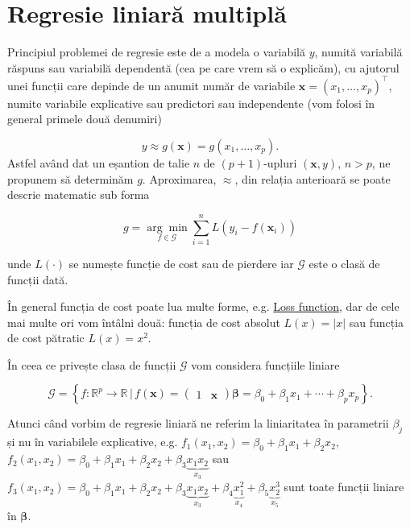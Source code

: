 \documentclass[]{article}
\begin{document}
\section{Regresie liniară multiplă}\label{regresie-liniara-multipla}

Principiul problemei de regresie este de a modela o variabilă \(y\),
numită variabilă răspuns sau variabilă dependentă (cea pe care vrem să o
explicăm), cu ajutorul unei funcții care depinde de un anumit număr de
variabile \(\boldsymbol x = (x_1,\ldots, x_p)^\intercal\), numite
variabile explicative sau predictori sau independente (vom folosi în
general primele două denumiri)

\[
  y\approx g(\boldsymbol x) = g(x_1,\ldots, x_p).
\] Astfel având dat un eșantion de talie \(n\) de \((p+1)\)-upluri
\((\boldsymbol x, y)\), \(n>p\), ne propunem să determinăm \(g\).
Aproximarea, \(\approx\), din relația anterioară se poate descrie
matematic sub forma

\[
  g = \underset{f\in\mathcal{G}}{\arg\min}\sum_{i = 1}^{n}L\left(y_i - f(\boldsymbol x_i)\right)
\]

unde \(L(\cdot)\) se numește funcție de cost sau de pierdere iar
\(\mathcal{G}\) este o clasă de funcții dată.

În general funcția de cost poate lua multe forme, e.g.
\href{https://en.wikipedia.org/wiki/Loss_function}{Loss function}, dar
de cele mai multe ori vom întâlni două: funcția de cost absolut
\(L(x) = |x|\) sau funcția de cost pătratic \(L(x) = x^2\).

În ceea ce privește clasa de funcții \(\mathcal{G}\) vom considera
funcțiile liniare

\[
\mathcal{G} = \left\{f:\mathbb{R}^p\to \mathbb{R}\,|\, f(\boldsymbol x) = \begin{pmatrix}1 & \boldsymbol x\end{pmatrix} \boldsymbol \beta = \beta_0 + \beta_1 x_1 +\cdots + \beta_p x_p\right\}.
\]

Atunci când vorbim de regresie liniară ne referim la liniaritatea în
parametrii \(\beta_j\) și nu în variabilele explicative, e.g.
\(f_1(x_1,x_2) = \beta_0 + \beta_1 x_1 + \beta_2 x_2\),
\(f_2(x_1, x_2) = \beta_0 + \beta_1 x_1 + \beta_2 x_2 + \beta_3 \underbrace{x_1 x_2}_{x_3}\)
sau
\(f_3(x_1, x_2) = \beta_0 + \beta_1 x_1 + \beta_2 x_2 + \beta_3 \underbrace{x_1 x_2}_{x_3}+ \beta_4 \underbrace{x_1^2}_{x_4}+ \beta_5 \underbrace{x_2^3}_{x_5}\)
sunt toate funcții liniare în \(\boldsymbol\beta\).
\end{document}
